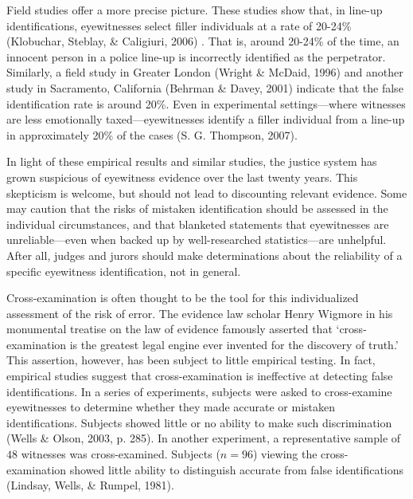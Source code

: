 \documentclass[
  10pt,
  dvipsnames,enabledeprecatedfontcommands]{scrartcl}
\begin{document}
Field studies offer a more precise picture. These studies show that, in
line-up identifications, eyewitnesses select filler individuals at a
rate of 20-24\% (Klobuchar, Steblay, \& Caligiuri, 2006) . That is,
around 20-24\% of the time, an innocent person in a police line-up is
incorrectly identified as the perpetrator. Similarly, a field study in
Greater London (Wright \& McDaid, 1996) and another study in Sacramento,
California (Behrman \& Davey, 2001) indicate that the false
identification rate is around 20\%. Even in experimental
settings---where witnesses are less emotionally taxed---eyewitnesses
identify a filler individual from a line-up in approximately 20\% of the
cases (S. G. Thompson, 2007).

In light of these empirical results and similar studies, the justice
system has grown suspicious of eyewitness evidence over the last twenty
years. This skepticism is welcome, but should not lead to discounting
relevant evidence. Some may caution that the risks of mistaken
identification should be assessed in the individual circumstances, and
that blanketed statements that eyewitnesses are unreliable---even when
backed up by well-researched statistics---are unhelpful. After all,
judges and jurors should make determinations about the reliability of a
specific eyewitness identification, not in general.

Cross-examination is often thought to be the tool for this
individualized assessment of the risk of error. The evidence law scholar
Henry Wigmore in his monumental treatise on the law of evidence famously
asserted that `cross-examination is the greatest legal engine ever
invented for the discovery of truth.' This assertion, however, has been
subject to little empirical testing.  In fact,
empirical studies suggest that cross-examination is ineffective at
detecting false identifications. In a series of experiments, subjects
were asked to cross-examine eyewitnesses to determine whether they made
accurate or mistaken identifications. Subjects showed little or no
ability to make such discrimination (Wells \& Olson, 2003, p. 285). In
another experiment, a representative sample of \(48\) witnesses was
cross-examined. Subjects (\(n = 96\)) viewing the cross-examination
showed little ability to distinguish accurate from false identifications
(Lindsay, Wells, \& Rumpel, 1981).
\end{document}
